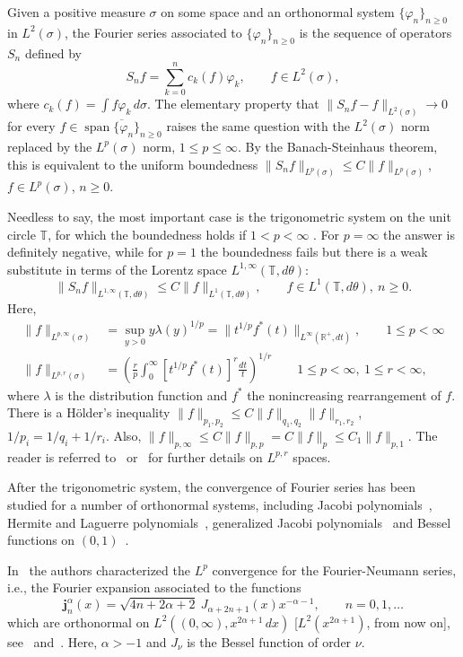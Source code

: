 \documentclass{amsart}
\theoremstyle{plain}
\newcommand{\spa}{\operatorname{span}}
\newcommand{\R}{\mathbb{R}}
\newcommand{\T}{\mathbb{T}}
\begin{document}
Given a positive measure $\sigma$ on some space and an orthonormal system 
$\{\varphi_n\}_{n\geq 0}$ in $L^2(\sigma)$, the
Fourier series associated to $\{\varphi_n\}_{n\geq 0}$ is the sequence of
operators $S_n$ defined by
\[
   S_n f = \sum_{k=0}^n c_k(f) \varphi_k,
   \qquad f \in L^2(\sigma),
\]
where $c_k(f) = \int f \varphi_k \, d\sigma$.
The elementary property that
$\| S_n f - f \|_{L^2(\sigma)} \longrightarrow 0$
for every $f \in \overline{\spa{\{\varphi_n\}_{n\geq0}}}$
raises the same question with the $L^2(\sigma)$ norm replaced by the
$L^p(\sigma)$ norm, $1 \leq p \leq \infty$. By the Banach-Steinhaus theorem,
this is equivalent to the uniform boundedness
$\| S_n f \|_{L^p(\sigma)} \leq  C \| f \|_{L^p(\sigma)}$,
$f \in L^p(\sigma)$, $n \geq 0$.

Needless to say, the most important case is the trigonometric system on the
unit circle $\T$, for which the boundedness holds if $1 < p < \infty$
\cite{R}. For $p =\infty$ the answer is definitely negative, while for $p
=1$ the boundedness fails but there is a weak substitute in terms of the
Lorentz space $L^{1,\infty}(\T,d\theta)$:
\[
   \| S_n f \|_{L^{1,\infty}(\T,d\theta)} \leq C \| f \|_{L^1(\T,d\theta)},
   \qquad f \in L^1(\T,d\theta), \ n \geq 0.
\]
Here,
\begin{align*}
   \| f \|_{L^{p,\infty}(\sigma)}
   &= \sup_{y>0} y \lambda(y)^{1/p}
   = \| t^{1/p} f^*(t) \|_{L^\infty(\R^+,dt)},
   \qquad 1 \leq p < \infty
   \\
   \| f \|_{L^{p,r}(\sigma)}
   &= \left(\frac{r}{p} \int_0^\infty [t^{1/p} f^*(t)]^r \frac{dt}{t}
     \right)^{1/r}
   \qquad 1 \leq p < \infty, \ 1 \leq r < \infty,
\end{align*}
where $\lambda$ is the distribution function and $f^*$ the
nonincreasing rearrangement of $f$. There is a H\"older's inequality
$\| f \|_{p_1,p_2} \leq C \| f \|_{q_1,q_2} \| f \|_{r_1,r_2}$, $1/p_i =
1/q_i + 1/r_i$. Also, $\| f \|_{p,\infty} \leq C \| f \|_{p,p} = C \| f \|_p
\leq C_1 \| f \|_{p,1}$. The reader is referred to~\cite{H} or~\cite{SW} for
further details on $L^{p,r}$ spaces.

After the trigonometric system, the convergence of Fourier series has been
studied for a number of orthonormal systems, including Jacobi
polynomials~\cite{P1,P2,M1,Ch1,GPV1}, Hermite and Laguerre
polynomials~\cite{M2,M3}, generalized Jacobi polynomials~\cite{B} and Bessel
functions on $(0,1)$~\cite{GPRV}.

In~\cite{V,GPV2} the authors characterized the $L^p$ convergence for the
Fourier-Neumann series, i.e., the Fourier expansion associated to the
functions
\[
   \mathbf{j}_n^\alpha(x)
   = \sqrt{4n+2\alpha+2} \ J_{\alpha+2n+1}(x) x^{-\alpha-1},
   \qquad n = 0, 1, \dots
\]
which are orthonormal on $L^2((0,\infty), x^{2\alpha+1} \, dx)$
[$L^2(x^{2\alpha+1})$, from now on], see~\cite[\S~13.41~(7), p.~404]{W}
and~\cite[\S~13.42~(1), p.~405]{W}. Here, $\alpha > -1$ and $J_\nu$ is
the Bessel function of order $\nu$.
\end{document}
